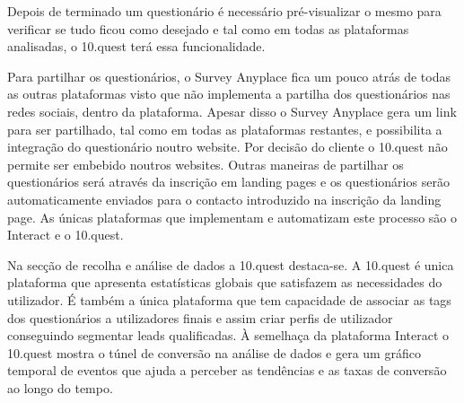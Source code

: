 Depois de terminado um questionário é necessário pré-visualizar o mesmo para verificar se tudo ficou como desejado e tal como em todas as plataformas analisadas, o 10.quest terá essa funcionalidade. 

Para partilhar os questionários, o Survey Anyplace fica um pouco atrás de todas as outras plataformas visto que não implementa a partilha dos questionários nas redes sociais, dentro da plataforma. Apesar disso o Survey Anyplace gera um link para ser partilhado, tal como em todas as plataformas restantes, e possibilita a integração do questionário noutro website. Por decisão do cliente o 10.quest não permite ser embebido noutros websites.  Outras maneiras de partilhar os questionários será através da inscrição em landing pages e os questionários serão automaticamente enviados para o contacto introduzido na inscrição da landing page. As únicas plataformas que implementam e automatizam este processo são o Interact e o 10.quest. 

Na secção de recolha e análise de dados a 10.quest destaca-se. A 10.quest é unica plataforma que apresenta estatísticas globais que satisfazem as necessidades do utilizador. É também a única plataforma que tem capacidade de associar as tags dos questionários a utilizadores finais e assim criar perfis de utilizador conseguindo segmentar leads qualificadas. À semelhaça da plataforma Interact o 10.quest mostra o túnel de conversão na análise de dados e gera um gráfico temporal de eventos que ajuda a perceber as tendências e as taxas de conversão ao longo do tempo.
 


	
	
